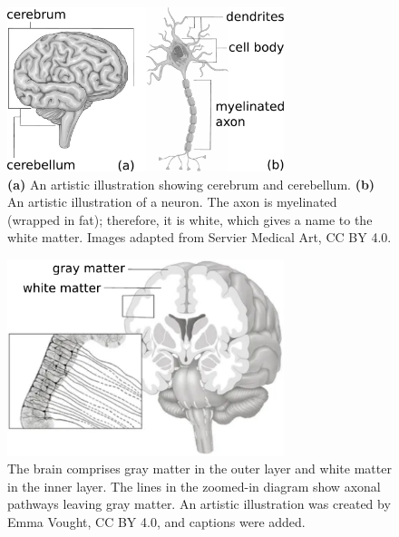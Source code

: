 \begin{figure}[!htb]
  \begin{center}
    \includegraphics[width=0.72\textwidth]{images/manually_created/brain/brain_neurone.pdf}
  \end{center}
  \caption[An artistic illustration of brain and neurone]{\textbf{(a)} An artistic illustration showing cerebrum and cerebellum. \textbf{(b)} An artistic illustration of a neuron. The axon is myelinated (wrapped in fat); therefore, it is white, which gives a name to the white matter. Images adapted from Servier Medical Art, CC BY 4.0.}
  \label{fig:brain_neurone_illustration}
\end{figure}
\begin{figure}[!htb]
  \begin{center}
    \includegraphics[width=0.72\textwidth]{images/manually_created/brain/brain_matter_illustration.pdf}
  \end{center}
  \caption[An artistic illustration of gray and white matter]{The brain comprises gray matter in the outer layer and white matter in the inner layer. The lines in the zoomed-in diagram show axonal pathways leaving gray matter. An artistic illustration was created by Emma Vought, CC BY 4.0, and captions were added. \cite{bonilha_gray_2015}}
  \label{fig:brain_matter_illustration}
\end{figure}


